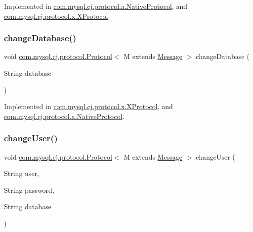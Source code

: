 Implemented in \mbox{\hyperlink{classcom_1_1mysql_1_1cj_1_1protocol_1_1a_1_1_native_protocol_a30895f4669b803d40bfc8dd8d3f1dd32}{com.\+mysql.\+cj.\+protocol.\+a.\+Native\+Protocol}}, and \mbox{\hyperlink{classcom_1_1mysql_1_1cj_1_1protocol_1_1x_1_1_x_protocol_a179c06c40d9fa5e7e30d79d9f96961a1}{com.\+mysql.\+cj.\+protocol.\+x.\+X\+Protocol}}.

\mbox{\label{interfacecom_1_1mysql_1_1cj_1_1protocol_1_1_protocol_a02558c9b17a492adb2e5b9cb0fb82778}} 
\subsubsection{\texorpdfstring{change\+Database()}{changeDatabase()}}
{\footnotesize\ttfamily void \mbox{\hyperlink{interfacecom_1_1mysql_1_1cj_1_1protocol_1_1_protocol}{com.\+mysql.\+cj.\+protocol.\+Protocol}}$<$ M extends \mbox{\hyperlink{interfacecom_1_1mysql_1_1cj_1_1protocol_1_1_message}{Message}} $>$.change\+Database (\begin{DoxyParamCaption}\item[{String}]{database }\end{DoxyParamCaption})}



Implemented in \mbox{\hyperlink{classcom_1_1mysql_1_1cj_1_1protocol_1_1x_1_1_x_protocol_a0370d4b1edd7b63667381cb3bd6b3085}{com.\+mysql.\+cj.\+protocol.\+x.\+X\+Protocol}}, and \mbox{\hyperlink{classcom_1_1mysql_1_1cj_1_1protocol_1_1a_1_1_native_protocol_a565743e2d31afb5137925eb2c372d344}{com.\+mysql.\+cj.\+protocol.\+a.\+Native\+Protocol}}.

\mbox{\label{interfacecom_1_1mysql_1_1cj_1_1protocol_1_1_protocol_ae7c8eae149543f5b736a905864b8c1f2}} 
\subsubsection{\texorpdfstring{change\+User()}{changeUser()}}
{\footnotesize\ttfamily void \mbox{\hyperlink{interfacecom_1_1mysql_1_1cj_1_1protocol_1_1_protocol}{com.\+mysql.\+cj.\+protocol.\+Protocol}}$<$ M extends \mbox{\hyperlink{interfacecom_1_1mysql_1_1cj_1_1protocol_1_1_message}{Message}} $>$.change\+User (\begin{DoxyParamCaption}\item[{String}]{user,  }\item[{String}]{password,  }\item[{String}]{database }\end{DoxyParamCaption})}

